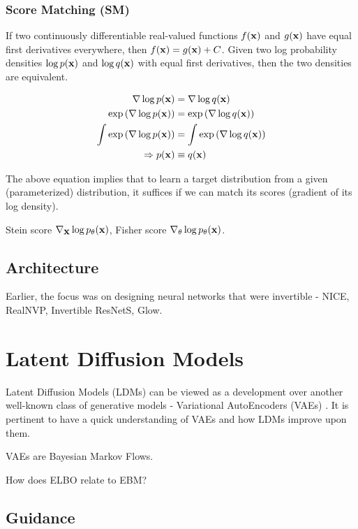 \documentclass[a4paper, 11pt]{article}
\begin{document}
\subsubsection{Score Matching (SM)}
If two continuously differentiable real-valued functions $f(\mbox{$\mbox{$\mathbf{x}$}$})$ and $g(\mbox{$\mbox{$\mathbf{x}$}$})$ have equal first derivatives everywhere, then $f(\mbox{$\mbox{$\mathbf{x}$}$}) = g(\mbox{$\mbox{$\mathbf{x}$}$}) + C$. Given two log probability densities $\log p(\mbox{$\mbox{$\mathbf{x}$}$})$ and $\log q(\mbox{$\mbox{$\mathbf{x}$}$})$ with equal first derivatives, then the two densities are equivalent.

\begin{align}
    \nabla \log p(\mbox{$\mbox{$\mathbf{x}$}$}) &= \nabla \log q(\mbox{$\mbox{$\mathbf{x}$}$}) \\ 
    \exp \left (\nabla \log p(\mbox{$\mbox{$\mathbf{x}$}$}) \right ) &= \exp \left (\nabla \log q(\mbox{$\mbox{$\mathbf{x}$}$}) \right) \\
    \int \exp \left (\nabla \log p(\mbox{$\mbox{$\mathbf{x}$}$}) \right ) &= \int \exp \left (\nabla \log q(\mbox{$\mbox{$\mathbf{x}$}$}) \right) \\ 
    \Rightarrow p(\mbox{$\mbox{$\mathbf{x}$}$}) &\equiv  q(\mbox{$\mbox{$\mathbf{x}$}$})
\end{align}

The above equation implies that to learn a target distribution from a given (parameterized) distribution, it suffices if we can match its scores (gradient of its log density).

Stein score $\nabla_{\mbox{$\mbox{$\mathbf{x}$}$}} \log p_{\theta}(\mbox{$\mbox{$\mathbf{x}$}$})$, Fisher score $\nabla_{\theta}\log p_{\theta}(\mbox{$\mbox{$\mathbf{x}$}$})$.

\subsection{Architecture}
Earlier, the focus was on designing neural networks that were invertible - NICE, RealNVP, Invertible ResNetS, Glow.

\section{Latent Diffusion Models}

Latent Diffusion Models (LDMs) can be viewed as a development over another well-known class of generative models - Variational AutoEncoders (VAEs) \cite{dieleman2023perspectives}. It is pertinent to have a quick understanding of VAEs and how LDMs improve upon them.

VAEs are Bayesian Markov Flows.

How does ELBO relate to EBM? 



\subsection{Guidance}
\end{document}
